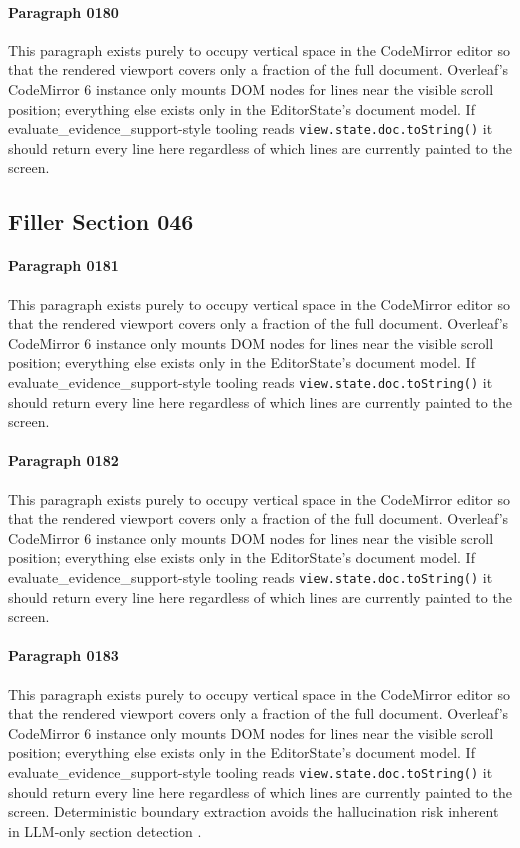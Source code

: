 \documentclass{article}
\begin{document}
\paragraph{Paragraph 0180}
This paragraph exists purely to occupy vertical space in the CodeMirror editor so that the rendered viewport covers only a fraction of the full document. Overleaf's CodeMirror 6 instance only mounts DOM nodes for lines near the visible scroll position; everything else exists only in the EditorState's document model. If evaluate\_evidence\_support-style tooling reads \texttt{view.state.doc.toString()} it should return every line here regardless of which lines are currently painted to the screen.

\subsection{Filler Section 046}
\paragraph{Paragraph 0181}
This paragraph exists purely to occupy vertical space in the CodeMirror editor so that the rendered viewport covers only a fraction of the full document. Overleaf's CodeMirror 6 instance only mounts DOM nodes for lines near the visible scroll position; everything else exists only in the EditorState's document model. If evaluate\_evidence\_support-style tooling reads \texttt{view.state.doc.toString()} it should return every line here regardless of which lines are currently painted to the screen.

\paragraph{Paragraph 0182}
This paragraph exists purely to occupy vertical space in the CodeMirror editor so that the rendered viewport covers only a fraction of the full document. Overleaf's CodeMirror 6 instance only mounts DOM nodes for lines near the visible scroll position; everything else exists only in the EditorState's document model. If evaluate\_evidence\_support-style tooling reads \texttt{view.state.doc.toString()} it should return every line here regardless of which lines are currently painted to the screen.

\paragraph{Paragraph 0183}
This paragraph exists purely to occupy vertical space in the CodeMirror editor so that the rendered viewport covers only a fraction of the full document. Overleaf's CodeMirror 6 instance only mounts DOM nodes for lines near the visible scroll position; everything else exists only in the EditorState's document model. If evaluate\_evidence\_support-style tooling reads \texttt{view.state.doc.toString()} it should return every line here regardless of which lines are currently painted to the screen. Deterministic boundary extraction avoids the hallucination risk inherent in LLM-only section detection \citep{trinh2019extraction}.
\end{document}
